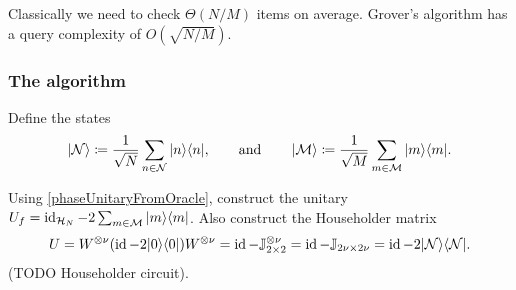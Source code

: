 Classically we need to check $\Theta(N/M)$ items on average. Grover's algorithm has a query complexity of $O(\sqrt{N/M})$.

\subsubsection{The algorithm}
Define the states
\[ \left| \mathcal{N} \right\rangle \coloneqq \frac{1}{\sqrt{N}}\sum_{n\in\mathcal{N}}|n\rangle\langle n|, \qquad\text{and}\qquad \left| \mathcal{M} \right\rangle \coloneqq \frac{1}{\sqrt{M}}\sum_{m\in\mathcal{M}}|m\rangle\langle m|. \]

Using \ref{phaseUnitaryFromOracle}, construct the unitary $U_f = \operatorname{id}_{\mathcal{H}_N} - 2\sum_{m\in\mathcal{M}}|m\rangle\langle m|$. Also construct the Householder matrix
\[ U = W^{\otimes\nu}(\operatorname{id} - 2|0\rangle\langle0|)W^{\otimes\nu} = \operatorname{id} - \mathbb{J}_{2\times 2}^{\otimes\nu} = \operatorname{id} - \mathbb{J}_{2\nu\times 2\nu} = \operatorname{id} - 2|\mathcal{N}\rangle\langle\mathcal{N}|. \]
(TODO Householder circuit).

